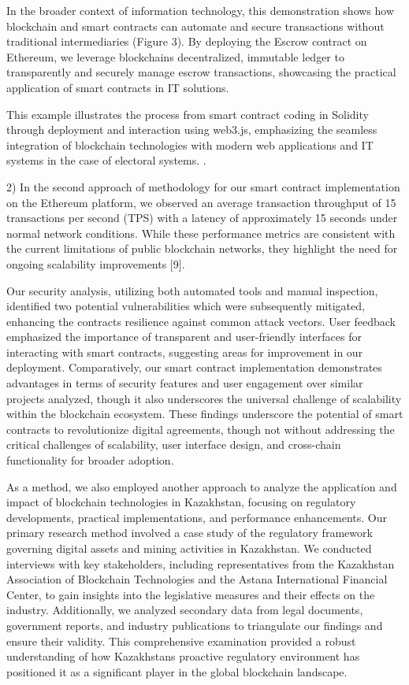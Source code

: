 \begin{multicols}{2}
In the broader context of information technology, this demonstration
shows how blockchain and smart contracts can automate and secure
transactions without traditional intermediaries (Figure 3). By deploying
the Escrow contract on Ethereum, we leverage
blockchain\textquotesingle s decentralized, immutable ledger to
transparently and securely manage escrow transactions, showcasing the
practical application of smart contracts in IT solutions.

This example illustrates the process from smart contract coding in
Solidity through deployment and interaction using web3.js, emphasizing
the seamless integration of blockchain technologies with modern web
applications and IT systems in the case of electoral systems. .

2) In the second approach of methodology for our smart contract
implementation on the Ethereum platform, we observed an average
transaction throughput of 15 transactions per second (TPS) with a
latency of approximately 15 seconds under normal network conditions.
While these performance metrics are consistent with the current
limitations of public blockchain networks, they highlight the need for
ongoing scalability improvements {[}9{]}.

Our security analysis, utilizing both automated tools and manual
inspection, identified two potential vulnerabilities which were
subsequently mitigated, enhancing the contract\textquotesingle s
resilience against common attack vectors. User feedback emphasized the
importance of transparent and user-friendly interfaces for interacting
with smart contracts, suggesting areas for improvement in our
deployment. Comparatively, our smart contract implementation
demonstrates advantages in terms of security features and user
engagement over similar projects analyzed, though it also underscores
the universal challenge of scalability within the blockchain ecosystem.
These findings underscore the potential of smart contracts to
revolutionize digital agreements, though not without addressing the
critical challenges of scalability, user interface design, and
cross-chain functionality for broader adoption.

As a method, we also employed another approach to analyze the
application and impact of blockchain technologies in Kazakhstan,
focusing on regulatory developments, practical implementations, and
performance enhancements. Our primary research method involved a case
study of the regulatory framework governing digital assets and mining
activities in Kazakhstan. We conducted interviews with key stakeholders,
including representatives from the Kazakhstan Association of Blockchain
Technologies and the Astana International Financial Center, to gain
insights into the legislative measures and their effects on the
industry. Additionally, we analyzed secondary data from legal documents,
government reports, and industry publications to triangulate our
findings and ensure their validity. This comprehensive examination
provided a robust understanding of how Kazakhstan\textquotesingle s
proactive regulatory environment has positioned it as a significant
player in the global blockchain landscape.


\end{multicols}
